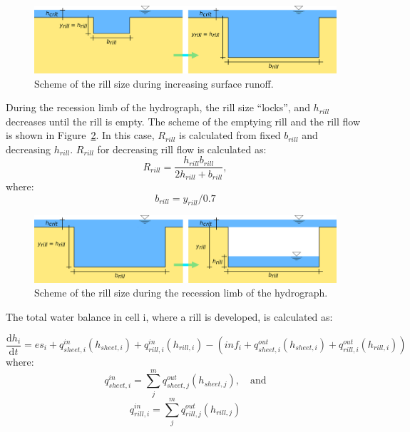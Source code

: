 \begin{figure}[b]
    \centering
    \includegraphics[width=1\linewidth]{./img/rill_schema_plneni.png}
    \caption{Scheme of the rill size during increasing surface runoff.}
    \label{fig:rill_plneni}
\end{figure}


During the recession limb of the hydrograph, the rill size “locks”, and
$h_{rill}$ decreases until the rill is empty. The scheme of the emptying rill
and the rill flow is shown in Figure~\ref{fig:rill_prazdneni}. In this case,
$R_{rill}$ is calculated from fixed $b_{rill}$ and decreasing $h_{rill}$.
$R_{rill}$ for decreasing rill flow is calculated as:
\begin{equation}
    R_{rill} = \frac{h_{rill}b_{rill}}{2h_{rill}+b_{rill}},
  \label{eq:rrill2}
\end{equation}
where:
\begin{equation}
  b_{rill} = y_{rill}/0.7
  \label{eq:brill2}
\end{equation}

\begin{figure}[t]
    \includegraphics[width=1\linewidth]{./img/rill_schema_prazdneni.png}
    \caption{Scheme of the rill size during the recession limb of the hydrograph.}
    \label{fig:rill_prazdneni}
\end{figure}

The total water balance in cell i, where a rill is developed, is calculated as:

\begin{equation}
    \frac{\mathrm{d}h_i}{\mathrm{d}t} = es_i + q^{in}_{sheet,i}(h_{sheet,i})
    +q^{in}_{rill,i}(h_{rill,i}) - (inf_i + q^{out}_{sheet,i}(h_{sheet,i}) +
    q^{out}_{rill,i}(h_{rill,i}))
\end{equation}
where:
\begin{equation}
    q^{in}_{sheet,i} = \sum_j^m q^{out}_{sheet, j}(h_{sheet,j}),\quad \mathrm{and}
\end{equation}
\begin{equation}
    q^{in}_{rill,i} = \sum_j^m q^{out}_{rill, j}(h_{rill,j})
\end{equation}


